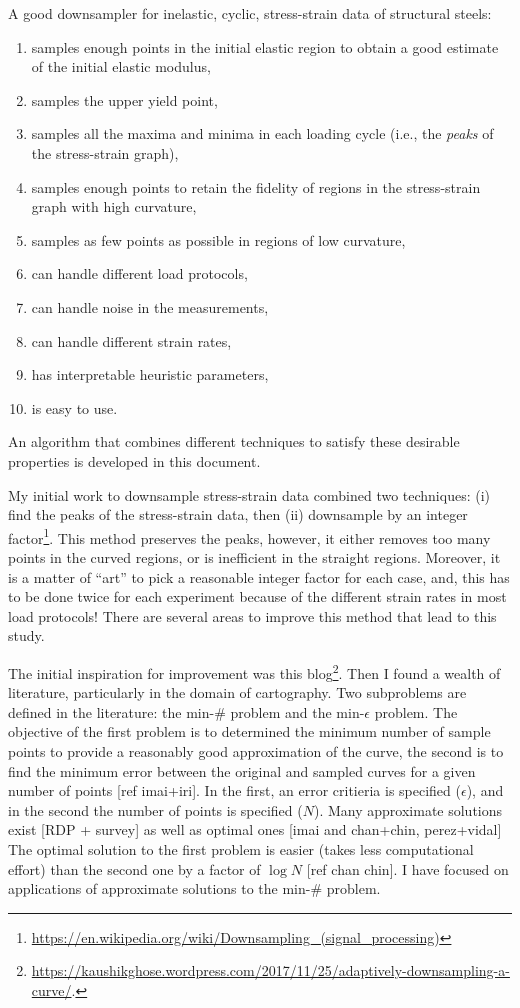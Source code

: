 \documentclass[a4paper,11pt]{article}
\begin{document}
A good downsampler for inelastic, cyclic, stress-strain data of structural steels:
\begin{enumerate}
    \item samples enough points in the initial elastic region to obtain a good estimate of the initial elastic modulus,
    \item samples the upper yield point,
    \item samples all the maxima and minima in each loading cycle (i.e., the \emph{peaks} of the stress-strain graph),
    \item samples enough points to retain the fidelity of regions in the stress-strain graph with high curvature,
    \item samples as few points as possible in regions of low curvature,
    \item can handle different load protocols,
    \item can handle noise in the measurements,
    \item can handle different strain rates,
    \item has interpretable heuristic parameters,
    \item is easy to use.
\end{enumerate}
An algorithm that combines different techniques to satisfy these desirable properties is developed in this document.

My initial work to downsample stress-strain data combined two techniques: (i) find the peaks of the stress-strain data, then (ii) downsample by an integer factor\footnote{\url{https://en.wikipedia.org/wiki/Downsampling_(signal_processing)}}.
This method preserves the peaks, however, it either removes too many points in the curved regions, or is inefficient in the straight regions.
Moreover, it is a matter of ``art'' to pick a reasonable integer factor for each case, and, this has to be done twice for each experiment because of the different strain rates in most load protocols!
There are several areas to improve this method that lead to this study.

The initial inspiration for improvement was this blog\footnote{\label{fn:blog}\url{https://kaushikghose.wordpress.com/2017/11/25/adaptively-downsampling-a-curve/}. \hfill}.
Then I found a wealth of literature, particularly in the domain of cartography.
Two subproblems are defined in the literature: the min-\# problem and the min-$\epsilon$ problem.
The objective of the first problem is to determined the minimum number of sample points to provide a reasonably good approximation of the curve, the second is to find the minimum error between the original and sampled curves for a given number of points [ref imai+iri].
In the first, an error critieria is specified ($\epsilon$), and in the second the number of points is specified ($N$).
Many approximate solutions exist [RDP + survey] as well as optimal ones [imai and chan+chin, perez+vidal]
The optimal solution to the first problem is easier (takes less computational effort) than the second one by a factor of $\log N$ [ref chan 
chin].
I have focused on applications of approximate solutions to the min-\# problem.
\end{document}
